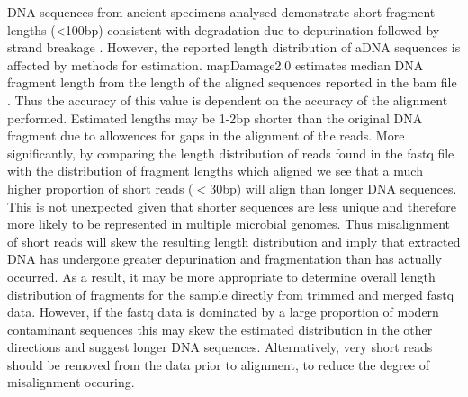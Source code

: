 \documentclass[12pt, a4paper]{article}
\begin{document}
DNA sequences from ancient specimens analysed demonstrate short fragment lengths (<100bp) consistent with degradation due to depurination followed by strand breakage \cite{Briggs:2007aa,Brotherton:2007aa}.
However, the reported length distribution of aDNA sequences is affected by methods for estimation.
mapDamage2.0 estimates median DNA fragment length from the length of the aligned sequences reported in the bam file \cite{Jonsson:2013aa}. 
Thus the accuracy of this value is dependent on the accuracy of the alignment performed.
Estimated lengths may be 1-2bp shorter than the original DNA fragment due to allowences for gaps in the alignment of the reads. 
More significantly, by comparing the length distribution of reads found in the fastq file with the distribution of fragment lengths which aligned we see that a much higher proportion of short reads ($<$30bp) will align than longer DNA sequences. 
This is not unexpected given that shorter sequences are less unique and therefore more likely to be represented in multiple microbial genomes. 
Thus misalignment of short reads will skew the resulting length distribution and imply that extracted DNA has undergone greater depurination and fragmentation than has actually occurred.
As a result, it may be more appropriate to determine overall length distribution of fragments for the sample directly from trimmed and merged fastq data. 
However, if the fastq data is dominated by a large proportion of modern contaminant sequences this may skew the estimated distribution in the other directions and suggest longer DNA sequences.
Alternatively, very short reads should be removed from the data prior to alignment, to reduce the degree of misalignment occuring.
\end{document}

